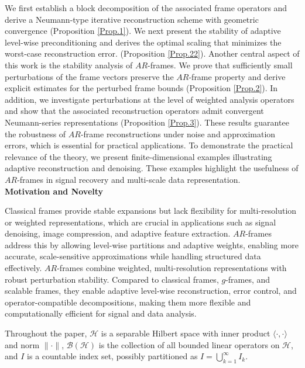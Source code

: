 \documentclass[12pt,titlepage]{amsart}
\theoremstyle{definition}
\theoremstyle{remark}
\begin{document}
We first establish a block decomposition of the associated frame
operators and derive a Neumann-type iterative reconstruction
scheme with geometric convergence (Proposition \ref{Prop.1}). We
next present the stability of adaptive level-wise preconditioning
and derives the optimal scaling that minimizes the worst-case
reconstruction error. (Proposition \ref{Prop.22}). Another central
aspect of this work is the stability analysis of $AR$-frames. We
prove that sufficiently small perturbations of the frame vectors
preserve the $AR$-frame property and derive explicit estimates for
the perturbed frame bounds (Proposition \ref{Prop.2}). In
addition, we investigate perturbations at the level of weighted
analysis operators and show that the associated reconstruction
operators admit convergent Neumann-series representations
(Proposition \ref{Prop.3}). These results guarantee the robustness
of $AR$-frame reconstructions under noise and approximation
errors, which is essential for practical applications. To
demonstrate the practical relevance of the theory, we present
finite-dimensional examples illustrating adaptive reconstruction
and denoising. These examples highlight the usefulness of
$AR$-frames in signal recovery and multi-scale
data representation.\\

\textbf{Motivation and Novelty}

Classical frames provide stable expansions but lack flexibility
for multi-resolution or weighted representations, which are
crucial in applications such as signal denoising, image
compression, and adaptive feature extraction. $AR$-frames address
this by allowing level-wise partitions and adaptive weights,
enabling more accurate, scale-sensitive approximations while
handling structured data effectively. $AR$-frames combine
weighted, multi-resolution representations with robust
perturbation stability. Compared to classical frames, $g$-frames,
and scalable frames, they enable adaptive level-wise
reconstruction, error control, and operator-compatible
decompositions, making them more flexible and computationally
efficient for signal and data analysis.

Throughout the paper, $\mathcal{H}$ is a separable Hilbert space
with inner product $\langle \cdot, \cdot \rangle$ and norm $\|
\cdot \|$, $\mathcal{B}(\mathcal{H})$ is the collection of all
bounded linear operators on $\mathcal{H}$, and $I$ is a countable
index set, possibly partitioned as $I = \bigcup_{k=1}^\infty I_k$.
\end{document}
